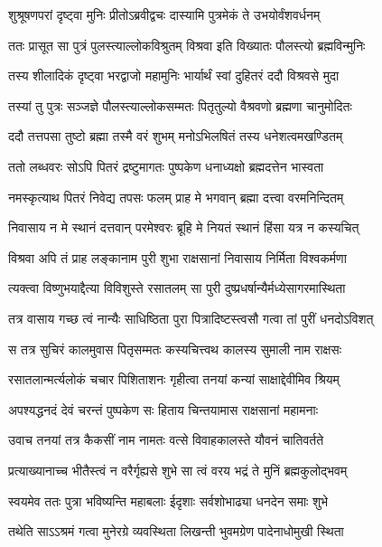 \twolineshloka
{शुश्रूषणपरां दृष्ट्वा मुनिः प्रीतोऽब्रवीद्वचः}
{दास्यामि पुत्रमेकं ते उभयोर्वंशवर्धनम्} %

\twolineshloka
{ततः प्रासूत सा पुत्रं पुलस्त्याल्लोकविश्रुतम्}
{विश्रवा इति विख्यातः पौलस्त्यो ब्रह्मविन्मुनिः} %

\twolineshloka
{तस्य शीलादिकं दृष्ट्वा भरद्वाजो महामुनिः}
{भार्यार्थं स्वां दुहितरं ददौ विश्रवसे मुदा} %

\twolineshloka
{तस्यां तु पुत्रः सञ्जज्ञे पौलस्त्याल्लोकसम्मतः}
{पितृतुल्यो वैश्रवणो ब्रह्मणा चानुमोदितः} %

\twolineshloka
{ददौ तत्तपसा तुष्टो ब्रह्मा तस्मै वरं शुभम्}
{मनोऽभिलषितं तस्य धनेशत्वमखण्डितम्} %

\twolineshloka
{ततो लब्धवरः सोऽपि पितरं द्रष्टुमागतः}
{पुष्पकेण धनाध्यक्षो ब्रह्मदत्तेन भास्वता} %

\twolineshloka
{नमस्कृत्याथ पितरं निवेद्य तपसः फलम्}
{प्राह मे भगवान् ब्रह्मा दत्त्वा वरमनिन्दितम्} %

\twolineshloka
{निवासाय न मे स्थानं दत्तवान् परमेश्वरः}
{ब्रूहि मे नियतं स्थानं हिंसा यत्र न कस्यचित्} %

\twolineshloka
{विश्रवा अपि तं प्राह लङ्कानाम पुरी शुभा}
{राक्षसानां निवासाय निर्मिता विश्वकर्मणा} %

\twolineshloka
{त्यक्त्वा विष्णुभयाद्दैत्या विविशुस्ते रसातलम्}
{सा पुरी दुष्प्रधर्षान्यैर्मध्येसागरमास्थिता} %

\twolineshloka
{तत्र वासाय गच्छ त्वं नान्यैः साधिष्ठिता पुरा}
{पित्रादिष्टस्त्वसौ गत्वा तां पुरीं धनदोऽविशत्} %

\twolineshloka
{स तत्र सुचिरं कालमुवास पितृसम्मतः}
{कस्यचित्त्वथ कालस्य सुमाली नाम राक्षसः} %

\twolineshloka
{रसातलान्मर्त्यलोकं चचार पिशिताशनः}
{गृहीत्वा तनयां कन्यां साक्षाद्देवीमिव श्रियम्} %

\twolineshloka
{अपश्यद्धनदं देवं चरन्तं पुष्पकेण सः}
{हिताय चिन्तयामास राक्षसानां महामनाः} %

\twolineshloka
{उवाच तनयां तत्र कैकसीं नाम नामतः}
{वत्से विवाहकालस्ते यौवनं चातिवर्तते} %

\twolineshloka
{प्रत्याख्यानाच्च भीतैस्त्वं न वरैर्गृह्यसे शुभे}
{सा त्वं वरय भद्रं ते मुनिं ब्रह्मकुलोद्भवम्} %

\twolineshloka
{स्वयमेव ततः पुत्रा भविष्यन्ति महाबलाः}
{ईदृशाः सर्वशोभाढ्या धनदेन समाः शुभे} %

\twolineshloka
{तथेति साऽऽश्रमं गत्वा मुनेरग्रे व्यवस्थिता}
{लिखन्ती भुवमग्रेण पादेनाधोमुखी स्थिता} %

